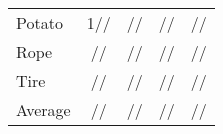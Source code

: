 \documentclass[lettersize,journal]{IEEEtran}
\begin{document}
\begin{table}[htbp]
{\begin{tabular}{lcccc}
      Potato     & 1//                                       & /{\color{red}{}}/{\color{red}{}}                           & {\color{blue}{}}/{\color{red}{}}/{\color{blue}{}}  & {\color{red}{}}/{\color{blue}{}}/                        \\
      Rope       & //                                       & /{\color{blue}{}}/{\color{blue}{}}                         & {\color{blue}{}}//                                                   & {\color{red}{}}/{\color{red}{}}/{\color{red}{}} \\
      Tire       & //                                        & /{\color{blue}{}}/{\color{blue}{}}                         & {\color{blue}{}}//{\color{blue}{}}                          & {\color{red}{}}/{\color{red}{}}/{\color{red}{}} \\\hline
      Average    & //                                       & //                                                                           & {\color{blue}{}}/{\color{blue}{}}/{\color{blue}{}} & {\color{red}{}}/{\color{red}{}}/{\color{red}{}} \\
\bottomrule
    \end{tabular}
  }
\end{table}
\end{document}
